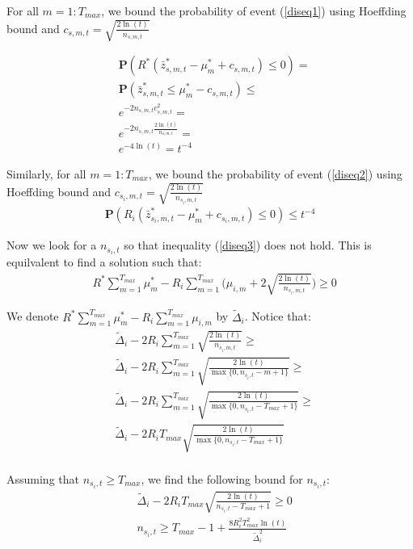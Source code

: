 For all $m=1:T_{max}$, we bound the probability of event (\ref{diseq1}) using Hoeffding bound and $c_{s,m,t}=\sqrt{\frac{2\ln(t)}{n_{s,m,t}}}$

\begin{align}
	&\mathbf{P}(R^*(\bar{z}^*_{s,m,t} - \mu^*_m + c_{s,m,t}) \le 0) = \nonumber\\
	&\mathbf{P}(\bar{z}^*_{s,m,t} \le \mu^*_m - c_{s,m,t}) \le \nonumber\\
	&e^{-2 n_{s,m,t} c^2_{s,m,t}} = \nonumber\\
	&e^{-2 n_{s,m,t} \frac{2\ln(t)}{n_{s,m,t}}} = \nonumber\\
	&e^{-4\ln(t)} = t^{-4}
\end{align}

Similarly, for all $m=1:T_{max}$, we bound the probability of event (\ref{diseq2}) using Hoeffding bound and $c_{s_i,m,t}=\sqrt{\frac{2\ln(t)}{n_{s_i,m,t}}}$
\begin{align}
	\mathbf{P}(R_i(\bar{z}^*_{s_i,m,t} - \mu^*_m + c_{s_i,m,t}) \le 0) \le t^{-4}
\end{align}

Now we look for a $n_{s_i,t}$ so that inequality (\ref{diseq3}) does not hold. This is equilvalent to find a solution such that:
\begin{align}
	&R^*\sum_{m=1}^{T_{max}}\mu^*_{m} - R_i \sum_{m=1}^{T_{max}}\Bigg( \mu_{i,m} +2\sqrt{\frac{2\ln(t)}{n_{s_i,m,t}}}\Bigg) \ge 0 \label{ineq_mag}
\end{align}

We denote $R^*\sum_{m=1}^{T_{max}}\mu^*_{m} - R_i \sum_{m=1}^{T_{max}} \mu_{i,m}$ by $\tilde{\Delta}_i$. Notice that:
\begin{align}
	&\tilde{\Delta}_i -2R_i\sum_{m=1}^{T_{max}}\sqrt{\frac{2\ln(t)}{n_{s_i,m,t}}} \ge \nonumber\\
	&\tilde{\Delta}_i -2R_i\sum_{m=1}^{T_{max}}\sqrt{\frac{2\ln(t)}{\max{\{0,n_{s_i,t}-m+1\}}}} \ge \\
	&\tilde{\Delta}_i -2R_i\sum_{m=1}^{T_{max}}\sqrt{\frac{2\ln(t)}{\max{\{0,n_{s_i,t}-T_{max}+1\}}}} \ge \\
	&\tilde{\Delta}_i -2R_iT_{max}\sqrt{\frac{2\ln(t)}{\max{\{0,n_{s_i,t}-T_{max}+1\}}}} \\
\end{align}


Assuming that $n_{s_i,t}\ge T_{max}$, we find the following bound for $n_{s_i,t}$:
\begin{align}
	&\tilde{\Delta}_i -2R_iT_{max}\sqrt{\frac{2\ln(t)}{n_{s_i,t}-T_{max}+1}} \ge 0 \nonumber\\
	&n_{s_i,t} \ge T_{max}-1+ \frac{8 R_i^2 T_{max}^2 \ln(t)}{\tilde{\Delta}_i^2}
\end{align}

